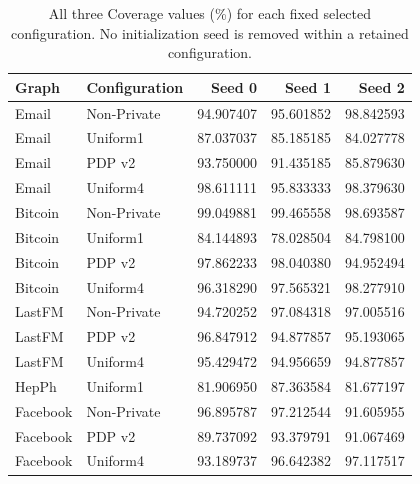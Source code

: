 \begin{table}[htbp]
\centering\small
\caption{All three Coverage values (\%) for each fixed selected configuration. No initialization seed is removed within a retained configuration.}\label{tab:frozenseeds}
\begin{tabular}{llrrr}
\toprule
Graph & Configuration & Seed 0 & Seed 1 & Seed 2\\ \midrule
Email & Non-Private & 94.907407 & 95.601852 & 98.842593 \\
Email & Uniform1 & 87.037037 & 85.185185 & 84.027778 \\
Email & PDP v2 & 93.750000 & 91.435185 & 85.879630 \\
Email & Uniform4 & 98.611111 & 95.833333 & 98.379630 \\
Bitcoin & Non-Private & 99.049881 & 99.465558 & 98.693587 \\
Bitcoin & Uniform1 & 84.144893 & 78.028504 & 84.798100 \\
Bitcoin & PDP v2 & 97.862233 & 98.040380 & 94.952494 \\
Bitcoin & Uniform4 & 96.318290 & 97.565321 & 98.277910 \\
LastFM & Non-Private & 94.720252 & 97.084318 & 97.005516 \\
LastFM & PDP v2 & 96.847912 & 94.877857 & 95.193065 \\
LastFM & Uniform4 & 95.429472 & 94.956659 & 94.877857 \\
HepPh & Uniform1 & 81.906950 & 87.363584 & 81.677197 \\
Facebook & Non-Private & 96.895787 & 97.212544 & 91.605955 \\
Facebook & PDP v2 & 89.737092 & 93.379791 & 91.067469 \\
Facebook & Uniform4 & 93.189737 & 96.642382 & 97.117517 \\
\bottomrule\end{tabular}
\end{table}
